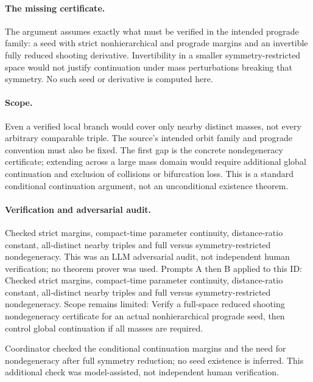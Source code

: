 \documentclass[11pt]{article}
\begin{document}
\paragraph{The missing certificate.}The argument assumes exactly what must be verified in the intended prograde family: a seed with strict nonhierarchical and prograde margins and an invertible fully reduced shooting derivative. Invertibility in a smaller symmetry-restricted space would not justify continuation under mass perturbations breaking that symmetry. No such seed or derivative is computed here.
\paragraph{Scope.}Even a verified local branch would cover only nearby distinct masses, not every arbitrary comparable triple. The source's intended orbit family and prograde convention must also be fixed. The first gap is the concrete nondegeneracy certificate; extending across a large mass domain would require additional global continuation and exclusion of collisions or bifurcation loss. This is a standard conditional continuation argument, not an unconditional existence theorem.

\paragraph{Verification and adversarial audit.}
Checked strict margins, compact-time parameter continuity, distance-ratio constant, all-distinct nearby triples and full versus symmetry-restricted nondegeneracy. This was an LLM adversarial audit, not independent human verification; no theorem prover was used. Prompts A then B applied to this ID: Checked strict margins, compact-time parameter continuity, distance-ratio constant, all-distinct nearby triples and full versus symmetry-restricted nondegeneracy. Scope remains limited: Verify a full-space reduced shooting nondegeneracy certificate for an actual nonhierarchical prograde seed, then control global continuation if all masses are required.

Coordinator checked the conditional continuation margins and the need for nondegeneracy after full symmetry reduction; no seed existence is inferred. This additional check was model-assisted, not independent human verification.
\end{document}
